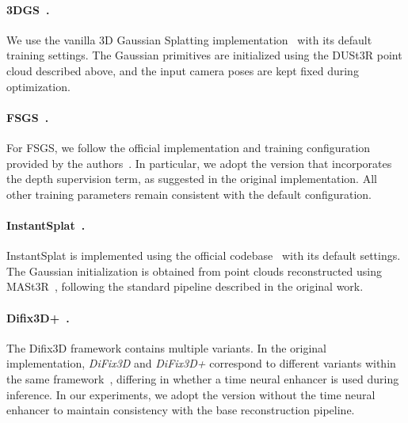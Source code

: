 
\paragraph{3DGS~\cite{kerbl20233d}.}
We use the vanilla 3D Gaussian Splatting implementation~\cite{kerbl20233d} with its default training settings. 
The Gaussian primitives are initialized using the DUSt3R point cloud described above, and the input camera poses are kept fixed during optimization.

\paragraph{FSGS~\cite{zhu2024fsgs}.}
For FSGS, we follow the official implementation and training configuration provided by the authors~\cite{zhu2024fsgs}. In particular, we adopt the version that incorporates the depth supervision term, as suggested in the original implementation. All other training parameters remain consistent with the default configuration.

\paragraph{InstantSplat~\cite{fan2024instantsplat}.}
InstantSplat is implemented using the official codebase~\cite{fan2024instantsplat} with its default settings. The Gaussian initialization is obtained from point clouds reconstructed using MASt3R~\cite{duisterhof2025mastrsfm}, following the standard pipeline described in the original work.

\paragraph{Difix3D+~\cite{wu2025difix3d+}.}
The Difix3D framework contains multiple variants. In the original implementation, \textit{DiFix3D} and \textit{DiFix3D+} correspond to different variants within the same framework~\cite{wu2025difix3d+}, differing in whether a time neural enhancer is used during inference. In our experiments, we adopt the version without the time neural enhancer to maintain consistency with the base reconstruction pipeline.

